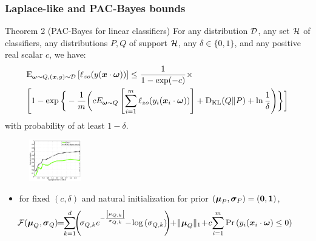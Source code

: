 \documentclass[mathserif]{beamer}
\begin{document}
\begin{frame}
\frametitle{ Laplace-like and PAC-Bayes bounds  }
\begin{block}{Theorem 2  (PAC-Bayes for linear classifiers)} 
For any distribution ${\cal D}$, any set $\cal H$
of classifiers, any distributions $P,Q$ of support $\cal H$, any
$\delta \in\{0,1\}$, and any positive real scalar $c$, we have:
\begin{align*}
&{\rm E}_{{\boldsymbol{\omega}}\sim Q, ({\boldsymbol{x}},y)\sim {\cal D}}\left[{\ell_{zo}(y({\boldsymbol{x}}\cdot{\boldsymbol{\omega}}))}\right]
\leq \label{main_eq}
 \frac{1}{1-\exp(-c)}\times \\ 
 &\Bigg [ 1-   \exp\bigg\{ -\frac{1}{m}\bigg(  cE_{{\boldsymbol{\omega}}\sim
     Q}\left[{\sum _{i=1}^m \ell_{zo}(y_{i}({\boldsymbol{x}}_{i}\cdot{\boldsymbol{\omega}})) }\right]
+{\textrm{D}_{\textrm{KL}}}(Q \Vert P)+\ln\frac{1}{\delta}\Bigg)\bigg\}\bigg]\nonumber
\end{align*}
with probability of at least $1-\delta$.
\begin{figure}
\includegraphics[width=0.2\textwidth]{figs/boundSimu}
\end{figure}
\end{block}

\begin{itemize}
\item for fixed $(c,\delta)$ and natural
initialization for  prior $({\boldsymbol{\mu}}_P,{\boldsymbol{\sigma}}_{P})= \left({{\boldsymbol{0}},{\boldsymbol{1}}}\right)$,
 \begin{align*}
 \!\!\!\!\!\!\!\!\!\!\!\!\!\!\F(\vmuq,\vsigmaq)\!\!=\!\!\sum_{k=1}^{d}\!\! \paren{\!\sigmaqi{k}e^{-\frac{\abs{\muqi{k}}}{\sigmaqi{k}}}\!\!-\!\log{ \paren{
      \sigmaqi{k} } }\!\! }\!\!+\!\Vert \vmuq
\Vert_1\!+\!c\! \sum _{i=1}^m\Pr\paren{ \yii(\vxii\cdot\vomega)\leq0} 
\end{align*}
\end{itemize}
\end{frame}
\end{document}
